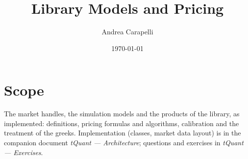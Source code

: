 \documentclass[11pt,a4paper]{article}
\title{Library Models and Pricing}
\author{Andrea Carapelli}
\date{\today}
\begin{document}
\maketitle
\tableofcontents
\clearpage

\section*{Scope}
The market handles, the simulation models and the products of the library, as implemented: definitions,
pricing formulas and algorithms, calibration and the treatment of the greeks. Implementation (classes, market
data layout) is in the companion document \emph{tQuant --- Architecture}; questions and exercises in
\emph{tQuant --- Exercises}.







\end{document}
